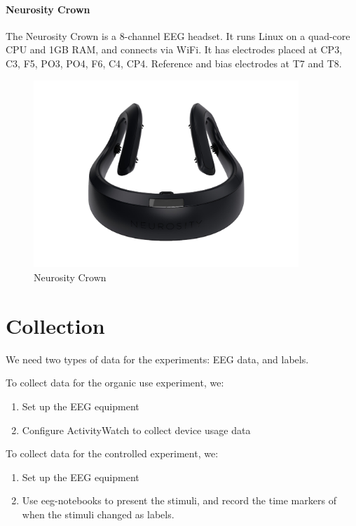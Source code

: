     \begin{minipage}{\textwidth}
        \paragraph*{Neurosity Crown}
        The Neurosity Crown is a 8-channel EEG headset. It runs Linux on a quad-core CPU and 1GB RAM, and connects via WiFi. It has electrodes placed at CP3, C3, F5, PO3, PO4, F6, C4, CP4. Reference and bias electrodes at T7 and T8.

        \begin{figure}[H]
            \centering
            \includegraphics[trim=0 100 0 100,clip,width=100mm]{img/crown-1.png}
            \caption{Neurosity Crown}\label{fig:crown}
        \end{figure}
    \end{minipage}

\pagebreak
\section{Collection}

We need two types of data for the experiments: EEG data, and labels.

To collect data for the organic use experiment, we:

\begin{enumerate}
    \item Set up the EEG equipment
    \item Configure ActivityWatch to collect device usage data
\end{enumerate}

To collect data for the controlled experiment, we:

\begin{enumerate}
    \item Set up the EEG equipment
    \item Use eeg-notebooks to present the stimuli, and record the time markers of when the stimuli changed as labels.
\end{enumerate}

